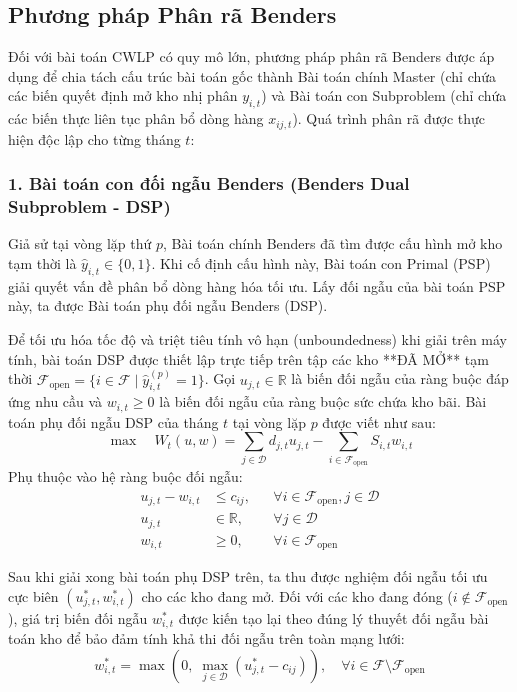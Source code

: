 \subsection{Phương pháp Phân rã Benders}

Đối với bài toán CWLP có quy mô lớn, phương pháp phân rã Benders \cite{sadatasl2021} được áp dụng để chia tách cấu trúc bài toán gốc thành Bài toán chính Master (chỉ chứa các biến quyết định mở kho nhị phân $y_{i,t}$) và Bài toán con Subproblem (chỉ chứa các biến thực liên tục phân bổ dòng hàng $x_{ij,t}$). Quá trình phân rã được thực hiện độc lập cho từng tháng $t$:

\subsubsection{1. Bài toán con đối ngẫu Benders (Benders Dual Subproblem - DSP)}
Giả sử tại vòng lặp thứ $p$, Bài toán chính Benders đã tìm được cấu hình mở kho tạm thời là $\hat{y}_{i,t} \in \{0, 1\}$. Khi cố định cấu hình này, Bài toán con Primal (PSP) giải quyết vấn đề phân bổ dòng hàng hóa tối ưu. Lấy đối ngẫu của bài toán PSP này, ta được Bài toán phụ đối ngẫu Benders (DSP).

Để tối ưu hóa tốc độ và triệt tiêu tính vô hạn (unboundedness) khi giải trên máy tính, bài toán DSP được thiết lập trực tiếp trên tập các kho **ĐÃ MỞ** tạm thời $\mathcal{F}_{\text{open}} = \{i \in \mathcal{F} \mid \hat{y}_{i,t}^{(p)} = 1\}$. Gọi $u_{j,t} \in \mathbb{R}$ là biến đối ngẫu của ràng buộc đáp ứng nhu cầu và $w_{i,t} \ge 0$ là biến đối ngẫu của ràng buộc sức chứa kho bãi. Bài toán phụ đối ngẫu DSP của tháng $t$ tại vòng lặp $p$ được viết như sau:
\begin{equation}
    \max \quad W_t(u, w) = \sum_{j \in \mathcal{D}} d_{j,t} u_{j,t} - \sum_{i \in \mathcal{F}_{\text{open}}} S_{i,t} w_{i,t}
\end{equation}
Phụ thuộc vào hệ ràng buộc đối ngẫu:
\begin{align}
    u_{j,t} - w_{i,t} &\le c_{ij}, && \forall i \in \mathcal{F}_{\text{open}}, j \in \mathcal{D} \\
    u_{j,t} &\in \mathbb{R}, && \forall j \in \mathcal{D} \\
    w_{i,t} &\ge 0, && \forall i \in \mathcal{F}_{\text{open}}
\end{align}

Sau khi giải xong bài toán phụ DSP trên, ta thu được nghiệm đối ngẫu tối ưu cực biên $(u_{j,t}^*, w_{i,t}^*)$ cho các kho đang mở. Đối với các kho đang đóng ($i \notin \mathcal{F}_{\text{open}}$), giá trị biến đối ngẫu $w_{i,t}^*$ được kiến tạo lại theo đúng lý thuyết đối ngẫu bài toán kho để bảo đảm tính khả thi đối ngẫu trên toàn mạng lưới:
\begin{equation}
    w_{i,t}^* = \max\left(0, \; \max_{j \in \mathcal{D}} (u_{j,t}^* - c_{ij})\right), \quad \forall i \in \mathcal{F} \setminus \mathcal{F}_{\text{open}}
\end{equation}

